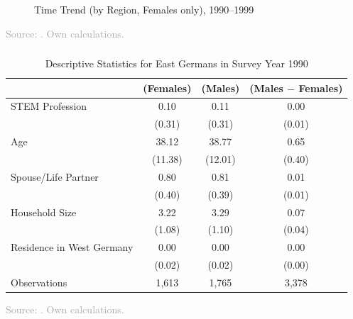 \documentclass[11pt, aspectratio=1610, xcolor={dvipsnames}]{beamer}
\begin{document}
	\begin{frame}
		\frametitle{}
		
		\begin{figure}[h]
			\centering
			\caption{Time Trend (by Region, Females only), 1990--1999}
			\label{fig:trend_zoomed}
			\resizebox{75mm}{!}{}
		\end{figure}
		
		{\scriptsize
			\textcolor{darkgray}{Source: \cite{SOEP2023}. Own calculations.}
		}
		
	\end{frame}
	
		\begin{frame}
		\frametitle{}
		{\linespread{1}\tiny
			\begin{table}[h]
				\centering
				\caption{Descriptive Statistics for East Germans in Survey Year 1990}
				\label{tab:descriptives}
				\begin{tabular}{l*{3}{c}}
					\toprule
					& (Females) & (Males) & (Males $-$ Females) \\
					\midrule
					STEM Profession     &        0.10&             0.11&          0.00      \\
					&     (0.31)&           (0.31)&           (0.01)\\
					\addlinespace
					Age                 &      38.12&          38.77&        0.65 \\
					&     (11.38)&        (12.01)         &      (0.40)\\
					\addlinespace
					Spouse/Life Partner &        0.80&            0.81&        0.01       \\
					&      (0.40)&          (0.39)&         (0.01)\\
					\addlinespace
					Household Size      &        3.22&         3.29&           0.07        \\
					&          (1.08)&       (1.10)        &      (0.04)\\
					\addlinespace
					Residence in West Germany&        0.00&        0.00&         0.00         \\
					&         (0.02)&       (0.02)&          (0.00)\\
					\midrule
					Observations        &        1,613&     1,765     &           3,378                \\
					\bottomrule
				\end{tabular}
			\end{table}
		}
		
		{\scriptsize
			\textcolor{darkgray}{Source: \cite{SOEP2023}. Own calculations.}
		}
		
	\end{frame}
	
\end{document}
